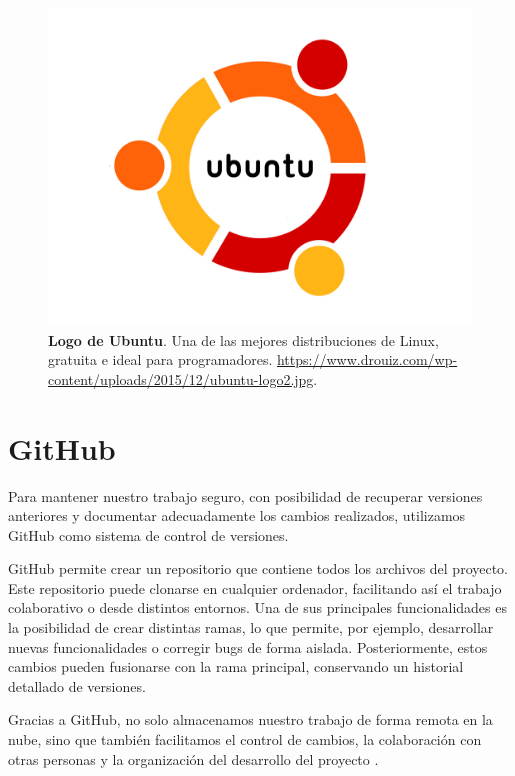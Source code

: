 \begin{figure}[H]
    \centering
    \includegraphics[width=1\linewidth]{imagenes/ubuntuLogo.jpg}
    \caption[\textbf{Logo de Ubuntu}.]{\textbf{Logo de Ubuntu}. Una de las mejores distribuciones de Linux, gratuita e ideal para programadores. \href{https://www.drouiz.com/wp-content/uploads/2015/12/ubuntu-logo2.jpg}{https://www.drouiz.com/wp-content/uploads/2015/12/ubuntu-logo2.jpg}.}
    \label{logo-ubuntu}
\end{figure}

\newpage


\section{GitHub}

Para mantener nuestro trabajo seguro, con posibilidad de recuperar versiones anteriores y documentar adecuadamente los cambios realizados, utilizamos GitHub como sistema de control de versiones.

GitHub permite crear un repositorio que contiene todos los archivos del proyecto. Este repositorio puede clonarse en cualquier ordenador, facilitando así el trabajo colaborativo o desde distintos entornos. Una de sus principales funcionalidades es la posibilidad de crear distintas ramas, lo que permite, por ejemplo, desarrollar nuevas funcionalidades o corregir bugs de forma aislada. Posteriormente, estos cambios pueden fusionarse con la rama principal, conservando un historial detallado de versiones.

Gracias a GitHub, no solo almacenamos nuestro trabajo de forma remota en la nube, sino que también facilitamos el control de cambios, la colaboración con otras personas y la organización del desarrollo del proyecto \cite{zagalsky2015emergence}.

